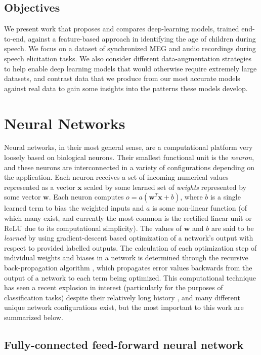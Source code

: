\documentclass[utf8]{frontiersSCNS} %
\begin{document}
\subsection{Objectives}

We present work that proposes and compares deep-learning models, trained end-to-end, against a feature-based approach in identifying the age of children during speech. We focus on a dataset of synchronized MEG and audio recordings during speech elicitation tasks. We also consider different data-augmentation strategies to help enable deep learning models that would otherwise require extremely large datasets, and contrast data that we produce from our most accurate models against real data to gain some insights into the patterns these models develop.

\section{Neural Networks}

Neural networks, in their most general sense, are a computational platform very loosely based on biological neurons. Their smallest functional unit is the {\em neuron}, and these neurons are interconnected in a variety of configurations depending on the application. Each neuron receives a set of incoming numerical values represented as a vector $\boldsymbol{x}$ scaled by some learned set of {\em weights} represented by some vector $\boldsymbol{w}$. Each neuron computes $o = a(\boldsymbol{w}^T\boldsymbol{x}+b)$, where $b$ is a single learned term to bias the weighted inputs and $a$ is some non-linear function (of which many exist, and currently the most common is the rectified linear unit or ReLU \cite{He2015a} due to its computational simplicity). The values of $\boldsymbol{w}$ and $b$ are said to be {\em learned} by using gradient-descent based optimization of a network's output with respect to provided labelled outputs. The calculation of each optimization step of individual weights and biases in a network is determined through the recursive back-propagation algorithm \cite{GoodfellowTextbook}, which propagates error values backwards from the output of a network to each term being optimized. This computational technique has seen a recent explosion in interest (particularly for the purposes of classification tasks) despite their relatively long history \cite{LeCun2015}, and many different unique network configurations exist, but the most important to this work are summarized below.

\subsection{Fully-connected feed-forward neural network}
\end{document}
